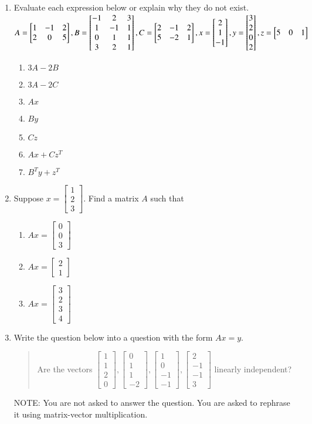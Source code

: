 \documentclass[minion]{homework}
\newcommand{\bbm}{\begin{bmatrix}}
\newcommand{\ebm}{\end{bmatrix}}
\def\vectwo#1#2{\begin{bmatrix}#1\\#2\end{bmatrix}}
\def\vecthree#1#2#3{\begin{bmatrix}#1\\#2\\#3\end{bmatrix}}
\def\vecfour#1#2#3#4{\begin{bmatrix}#1\\#2\\#3\\#4\end{bmatrix}}
\begin{document}
\begin{enumerate}
\item Evaluate each expression below or explain why they do not exist.\\

$A=\bbm 1&-1&2\\2&0&5 \ebm, \hfill B=\bbm -1&2&3\\ 1&-1&1\\
0&1&1\\ 3&2&1 \ebm,  \hfill C= \bbm 2&-1&2 \\5&-2&1 \ebm, \\ \quad \\ \hfill x=\vecthree2 1 {-1}, \hfill y=\vecfour3 2 0 2, \hfill z= \bbm 5 & 0& 1 \ebm$
	\begin{enumerate}
	\item $3A-2B$
	\item $3A-2C$
	\item $Ax$
	\item $By$
	\item $Cz$
	\item $Ax+Cz^T$
	\item $B^Ty+z^T$
	\end{enumerate}
\item Suppose $x=\vecthree 1 2 3$. Find a matrix $A$ such that
	\begin{enumerate}
	\item $Ax= \vecthree 0 0 3$
	\item $Ax= \vectwo 2 1$
	\item $Ax = \vecfour 3 2 3 4$
	\end{enumerate}
\item Write the question below into a question with the form $Ax=y.$
\begin{quote} Are the vectors $\vecfour 1 1 2 0, \vecfour 0 1 1 {-2}, \vecfour 1 0 {-1} {-1}, \vecfour 2 {-1} {-1} 3 $  linearly independent? \end{quote}

NOTE: You are not asked to answer the question. You are asked to rephrase it using matrix-vector multiplication.
\end{enumerate}
\end{document}
